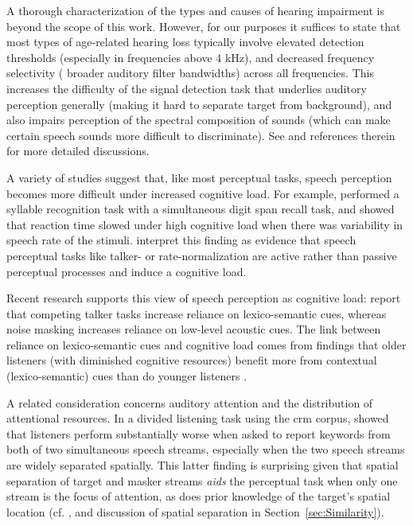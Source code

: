 A thorough characterization of the types and causes of hearing impairment is beyond the scope of this work.\footnotemark{}  However, for our purposes it suffices to state that most types of age-related hearing loss typically involve elevated detection thresholds (especially in frequencies above 4 kHz), and decreased frequency selectivity (\ie{} broader auditory filter bandwidths) across all frequencies.  This increases the difficulty of the signal detection task that underlies auditory perception generally (making it hard to separate target from background), and also impairs perception of the spectral composition of sounds (which can make certain speech sounds more difficult to discriminate).  See \citet[117–119]{Moore2008} and references therein for more detailed discussions.


A variety of studies suggest that, like most perceptual tasks, speech perception becomes more difficult under increased cognitive load.  For example, \citet{FrancisNusbaum1996} performed a syllable recognition task with a simultaneous digit span recall task, and showed that reaction time slowed under high cognitive load when there was variability in speech rate of the stimuli.  \citeauthor{FrancisNusbaum1996} interpret this finding as evidence that speech perceptual tasks like talker- or rate-normalization are active rather than passive perceptual processes and induce a cognitive load.  

Recent research supports this view of speech perception as cognitive load: \citet{MattysEtAl2009} report that competing talker tasks increase reliance on lexico-semantic cues, whereas noise masking increases reliance on low-level acoustic cues.  The link between reliance on lexico-semantic cues and cognitive load comes from findings that older listeners (with diminished cognitive resources) benefit more from contextual (lexico-semantic) cues than do younger listeners \citep{PichoraFullerEtAl1995, SommersDanielson1999}.  %

A related consideration concerns auditory attention and the distribution of attentional resources.  In a divided listening task using the \ac{crm} corpus, \citet{BestEtAl2006} showed that listeners perform substantially worse when asked to report keywords from both of two simultaneous speech streams, especially when the two speech streams are widely separated spatially.  This latter finding is surprising given that spatial separation of target and masker streams {\em aids} the perceptual task when only one stream is the focus of attention, as does prior knowledge of the target’s spatial location (cf. \citealt{KiddEtAl2005a}, and discussion of spatial separation in Section~\ref{sec:Similarity}).  

